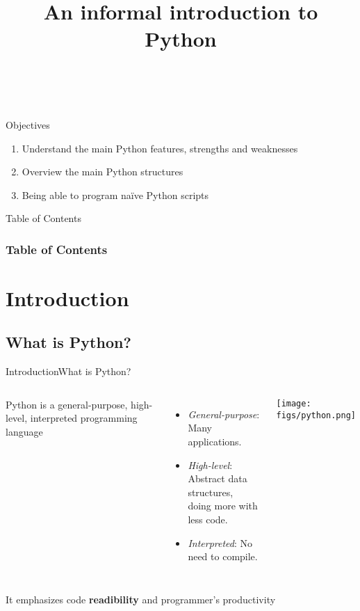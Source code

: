 \documentclass[10pt,compress]{beamer} %
\title[An informal introduction to Python]{An informal introduction to Python}
\author{\asignatura\\\carrera}
\institute{}
\date{}
\begin{document}
{\titlepageBlue
    \begin{frame}
        \titlepage
    \end{frame}
}

\institute{\asignatura}

\begin{frame}[plain]{}
	\begin{block}{Objectives}
		\begin{enumerate}
		\item Understand the main Python features, strengths and weaknesses
		\item Overview the main Python structures
		\item Being able to program na\"ive Python scripts
		\end{enumerate}
	\end{block}
\end{frame}

{
\begin{frame}[shrink]{Table of Contents}
 \frametitle{Table of Contents}
 \tableofcontents
\end{frame}
}

\section{Introduction}
\subsection{What is Python?}

\begin{frame}{Introduction}{What is Python?}
    \begin{columns}
			Python is a general-purpose, high-level, interpreted programming language
				\begin{itemize}
				\item \textit{General-purpose}: Many applications.
				\item \textit{High-level}: Abstract data structures, \\doing more with less code.
				\item \textit{Interpreted}: No need to compile.
				\end{itemize}

		\centering \hspace{-2cm} \texttt{[image: figs/python.png]}
	\end{columns}
	\bigskip
			It emphasizes code \textbf{readibility} and programmer's productivity\\
\end{frame}
\end{document}
